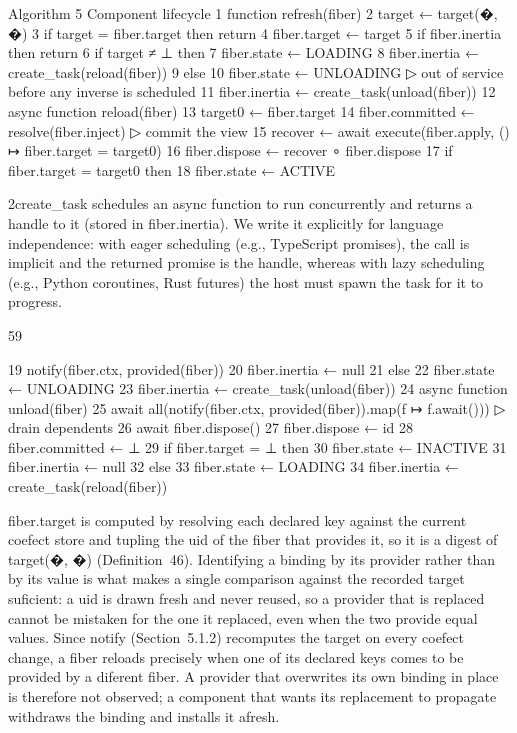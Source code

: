 \documentclass[
  10
]{article}
\begin{document}
Algorithm 5 Component lifecycle 1 function refresh(fiber) 2 target ←
target(�, �) 3 if target = fiber.target then return 4 fiber.target ←
target 5 if fiber.inertia then return 6 if target ≠ ⊥ then 7 fiber.state
← LOADING 8 fiber.inertia ← create\_task(reload(fiber)) 9 else 10
fiber.state ← UNLOADING ▷ out of service before any inverse is scheduled
11 fiber.inertia ← create\_task(unload(fiber)) 12 async function
reload(fiber) 13 target0 ← fiber.target 14 fiber.committed ←
resolve(fiber.inject) ▷ commit the view 15 recover ← await
execute(fiber.apply, () ↦ fiber.target = target0) 16 fiber.dispose ←
recover ∘ fiber.dispose 17 if fiber.target = target0 then 18 fiber.state
← ACTIVE

2create\_task schedules an async function to run concurrently and
returns a handle to it (stored in fiber.inertia). We write it explicitly
for language independence: with eager scheduling (e.g., TypeScript
promises), the call is implicit and the returned promise is the handle,
whereas with lazy scheduling (e.g., Python coroutines, Rust futures) the
host must spawn the task for it to progress.

59

19 notify(fiber.ctx, provided(fiber)) 20 fiber.inertia ← null 21 else 22
fiber.state ← UNLOADING 23 fiber.inertia ← create\_task(unload(fiber))
24 async function unload(fiber) 25 await all(notify(fiber.ctx,
provided(fiber)).map(f ↦ f.await())) ▷ drain dependents 26 await
fiber.dispose() 27 fiber.dispose ← id 28 fiber.committed ← ⊥ 29 if
fiber.target = ⊥ then 30 fiber.state ← INACTIVE 31 fiber.inertia ← null
32 else 33 fiber.state ← LOADING 34 fiber.inertia ←
create\_task(reload(fiber))

fiber.target is computed by resolving each declared key against the
current coefect store and tupling the uid of the fiber that provides it,
so it is a digest of target(�, �) (Definition~46). Identifying a binding
by its provider rather than by its value is what makes a single
comparison against the recorded target suficient: a uid is drawn fresh
and never reused, so a provider that is replaced cannot be mistaken for
the one it replaced, even when the two provide equal values. Since
notify (Section~5.1.2) recomputes the target on every coefect change, a
fiber reloads precisely when one of its declared keys comes to be
provided by a diferent fiber. A provider that overwrites its own binding
in place is therefore not observed; a component that wants its
replacement to propagate withdraws the binding and installs it afresh.
\end{document}
